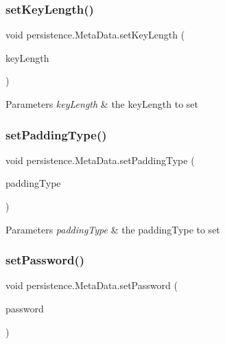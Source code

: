 \subsubsection{\texorpdfstring{set\+Key\+Length()}{setKeyLength()}}
{\footnotesize\ttfamily void persistence.\+Meta\+Data.\+set\+Key\+Length (\begin{DoxyParamCaption}\item[{\mbox{\hyperlink{enumenums_1_1_key_length}{Key\+Length}}}]{key\+Length }\end{DoxyParamCaption})}


\begin{DoxyParams}{Parameters}
{\em key\+Length} & the key\+Length to set \\
\hline
\end{DoxyParams}
\mbox{\label{classpersistence_1_1_meta_data_a296b3684b18af3ab1a8b7e628a686d3d}} 
\subsubsection{\texorpdfstring{set\+Padding\+Type()}{setPaddingType()}}
{\footnotesize\ttfamily void persistence.\+Meta\+Data.\+set\+Padding\+Type (\begin{DoxyParamCaption}\item[{\mbox{\hyperlink{enumenums_1_1_padding_type}{Padding\+Type}}}]{padding\+Type }\end{DoxyParamCaption})}


\begin{DoxyParams}{Parameters}
{\em padding\+Type} & the padding\+Type to set \\
\hline
\end{DoxyParams}
\mbox{\label{classpersistence_1_1_meta_data_aa1768eb02bec3fc914c741c50574ef80}} 
\subsubsection{\texorpdfstring{set\+Password()}{setPassword()}}
{\footnotesize\ttfamily void persistence.\+Meta\+Data.\+set\+Password (\begin{DoxyParamCaption}\item[{char \mbox{[}$\,$\mbox{]}}]{password }\end{DoxyParamCaption})}


